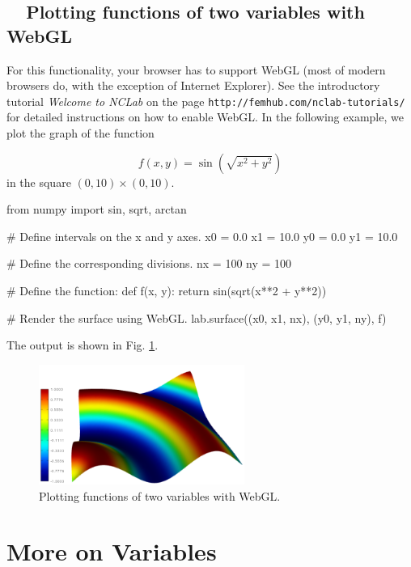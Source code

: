 \subsection{\ \ Plotting functions of two variables with WebGL}

For this functionality, your browser has to support WebGL (most of modern browsers do, 
with the exception of Internet Explorer). See the introductory tutorial {\em Welcome to NCLab}
on the page {\tt http://femhub.com/nclab-tutorials/} for detailed instructions on how to enable WebGL. 
In the following example, we plot the graph of the function 

$$
  f(x, y) = \sin(\sqrt{x^2 + y^2})
$$
in the square $(0, 10) \times (0, 10)$.

\begin{bluecode}
from numpy import sin, sqrt, arctan

# Define intervals on the x and y axes.
x0 = 0.0
x1 = 10.0
y0 = 0.0
y1 = 10.0

# Define the corresponding divisions.
nx = 100
ny = 100

# Define the function:
def f(x, y):
    return sin(sqrt(x**2 + y**2))

# Render the surface using WebGL.
lab.surface((x0, x1, nx), (y0, y1, ny), f)
\end{bluecode}
The output is shown in Fig. \ref{fig:webgl}.

\begin{figure}[!ht]
\begin{center}
\includegraphics[width=0.6\textwidth]{imgp/webgl.png}
\end{center}
\vspace{-2mm}
\caption{Plotting functions of two variables with WebGL.}
\label{fig:webgl}
\end{figure}


\section{More on Variables}

